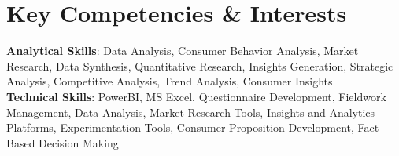\documentclass[letterpaper,12pt]{article}
\begin{document}
\section{Key Competencies \& Interests}
\begin{itemize}[leftmargin=0.15in, label={}]
\small{\item{
\vspace{1mm}
\textbf{Analytical Skills}{: Data Analysis, Consumer Behavior Analysis, Market Research, Data Synthesis, Quantitative Research, Insights Generation, Strategic Analysis, Competitive Analysis, Trend Analysis, Consumer Insights} \\ \vspace{1mm} 
\textbf{Technical Skills}{: PowerBI, MS Excel, Questionnaire Development, Fieldwork Management, Data Analysis, Market Research Tools, Insights and Analytics Platforms, Experimentation Tools, Consumer Proposition Development, Fact-Based Decision Making} \\ \vspace{1mm}
}}
\end{itemize}
\begin{center}
\end{center}
\end{document}
